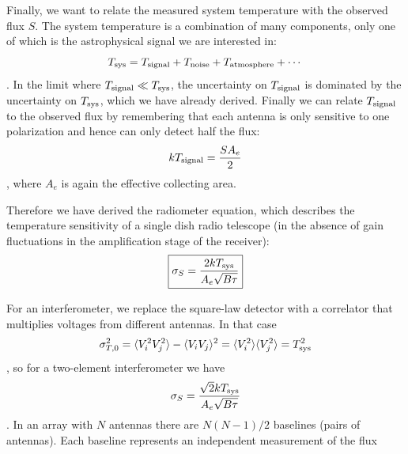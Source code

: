 \begin{enumerate}
      Finally, we want to relate the measured system temperature with the observed flux $S$.
      The system temperature is a combination of many components, only one of which is the
      astrophysical signal we are interested in:
      \begin{dmath}
        T_{\rm sys} = T_{\rm signal} + T_{\rm noise} + T_{\rm atmosphere} + \cdots
      \end{dmath}.
      In the limit where $T_{\rm signal} \ll T_{\rm sys}$, the uncertainty on $T_{\rm signal}$
      is dominated by the uncertainty on $T_{\rm sys}$, which we have already derived.
      Finally we can relate $T_{\rm signal}$ to the observed flux by remembering that each
      antenna is only sensitive to one polarization and hence can only detect half the flux:
      \begin{dmath}
        kT_{\rm signal} = \frac{SA_e}{2}
      \end{dmath},
      where $A_e$ is again the effective collecting area.

      Therefore we have derived the radiometer equation, which describes the temperature
      sensitivity of a single dish radio telescope (in the absence of gain fluctuations in
      the amplification stage of the receiver):
      \begin{dmath}\boxed{
        \sigma_S = \frac{2kT_{\rm sys}}{A_e\sqrt{B\tau}}
      }\end{dmath}

      For an interferometer, we replace the square-law detector with a correlator that multiplies
      voltages from different antennas.  In that case
      \begin{dmath*}
        \sigma_{T,0}^2 = \langle V_i^2V_j^2\rangle - \langle V_iV_j\rangle^2
                       = \langle V_i^2\rangle\langle V_j^2\rangle \nolinebreak
                       = T_{\rm sys}^2
      \end{dmath*},
      so for a two-element interferometer we have
      \begin{dmath}
        \sigma_S = \frac{\sqrt{2}kT_{\rm sys}}{A_e\sqrt{B\tau}}
      \end{dmath}.
      In an array with $N$ antennas there are $N(N-1)/2$ baselines (pairs of antennas).
      Each baseline represents an independent measurement of the flux
\end{enumerate}
